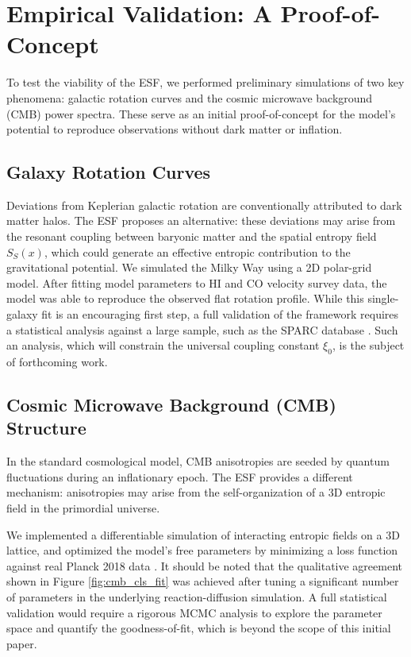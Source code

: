\documentclass[12pt, a4paper]{article}
\begin{document}
\section{Empirical Validation: A Proof-of-Concept}
\label{sec:results}

To test the viability of the ESF, we performed preliminary simulations of two key phenomena: galactic rotation curves and the cosmic microwave background (CMB) power spectra. These serve as an initial proof-of-concept for the model's potential to reproduce observations without dark matter or inflation.

\subsection{Galaxy Rotation Curves}
Deviations from Keplerian galactic rotation are conventionally attributed to dark matter halos. The ESF proposes an alternative: these deviations may arise from the resonant coupling between baryonic matter and the spatial entropy field \( S_S(x) \), which could generate an effective entropic contribution to the gravitational potential. We simulated the Milky Way using a 2D polar-grid model. After fitting model parameters to HI and CO velocity survey data, the model was able to reproduce the observed flat rotation profile. While this single-galaxy fit is an encouraging first step, a full validation of the framework requires a statistical analysis against a large sample, such as the SPARC database \cite{Lelli2016}. Such an analysis, which will constrain the universal coupling constant \(\xi_0\), is the subject of forthcoming work.

\subsection{Cosmic Microwave Background (CMB) Structure}
In the standard cosmological model, CMB anisotropies are seeded by quantum fluctuations during an inflationary epoch. The ESF provides a different mechanism: anisotropies may arise from the self-organization of a 3D entropic field in the primordial universe.

We implemented a differentiable simulation of interacting entropic fields on a 3D lattice, and optimized the model's free parameters by minimizing a loss function against real Planck 2018 data \cite{Planck2018}. It should be noted that the qualitative agreement shown in Figure \ref{fig:cmb_cls_fit} was achieved after tuning a significant number of parameters in the underlying reaction-diffusion simulation. A full statistical validation would require a rigorous MCMC analysis to explore the parameter space and quantify the goodness-of-fit, which is beyond the scope of this initial paper.
\end{document}
